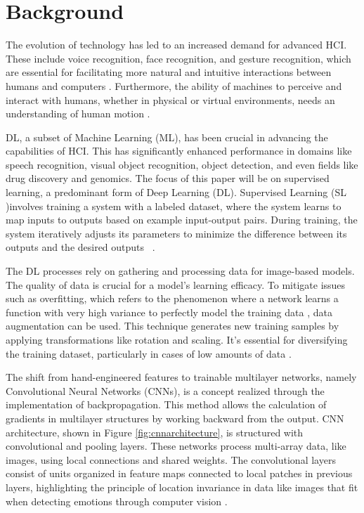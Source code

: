 \documentclass[runningheads]{llncs}
\begin{document}
\section{Background}
\label{sec:background}

The evolution of technology has led to an increased demand for advanced HCI. These include voice recognition, face recognition, and gesture recognition, which are essential for facilitating more natural and intuitive interactions between humans and computers \cite{Alrowais2023}. Furthermore, the ability of machines to perceive and interact with humans, whether in physical or virtual environments, needs an understanding of human motion \cite{Martinez2017}.

DL, a subset of Machine Learning (ML), has been crucial in advancing the capabilities of HCI. This has significantly enhanced performance in domains like speech recognition, visual object recognition, object detection, and even fields like drug discovery and genomics. The focus of this paper will be on supervised learning, a predominant form of Deep Learning (DL). Supervised Learning (SL )involves training a system with a labeled dataset, where the system learns to map inputs to outputs based on example input-output pairs. During training, the system iteratively adjusts its parameters to minimize the difference between its outputs and the desired outputs \cite{Lecun2015}~\cite{Mahony2020}.

The DL processes rely on gathering and processing data for image-based models. The quality of data is crucial for a model's learning efficacy. To mitigate issues such as overfitting, which refers to the phenomenon where a network learns a function with very high variance to perfectly model the training data \cite{Shorten2019}, data augmentation can be used. This technique generates new training samples by applying transformations like rotation and scaling. It's essential for diversifying the training dataset, particularly in cases of low amounts of data \cite{Khalifa2022}.

The shift from hand-engineered features to trainable multilayer networks, namely Convolutional Neural Networks (CNNs), is a concept realized through the implementation of backpropagation. This method allows the calculation of gradients in multilayer structures by working backward from the output. CNN architecture, shown in Figure \ref{fig:cnnarchitecture}, is structured with convolutional and pooling layers. These networks process multi-array data, like images, using local connections and shared weights. The convolutional layers consist of units organized in feature maps connected to local patches in previous layers, highlighting the principle of location invariance in data like images that fit when detecting emotions through computer vision \cite{Lecun2015}.
\end{document}
